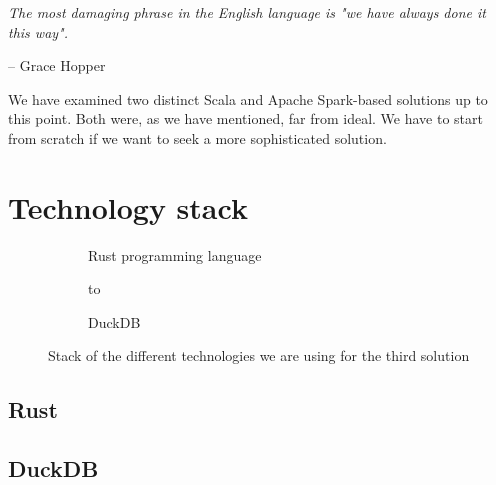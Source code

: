 \epigraph{\textit{The most damaging phrase in the English language is "we have always done it this way".}}{-- \textup{Grace Hopper}}

We have examined two distinct Scala and Apache Spark-based solutions up to this point. Both were, as we have mentioned, far from ideal. We have to start from scratch if we want to seek a more sophisticated solution.

\section{Technology stack}

\begin{figure}[ht]
    \newsavebox\mybox

    \begin{subfigure}{.45\textwidth}
        \centering
        \usebox{\mybox}
        \caption{Rust programming language}
    \end{subfigure}%
    \hspace*{0.5em}
    \begin{subfigure}{.45\textwidth}
        \centering
        \vbox to \ht{}
        \caption{DuckDB}
    \end{subfigure}%
    \caption{Stack of the different technologies we are using for the third solution}
\end{figure}

\subsection{Rust}

\subsection{DuckDB}